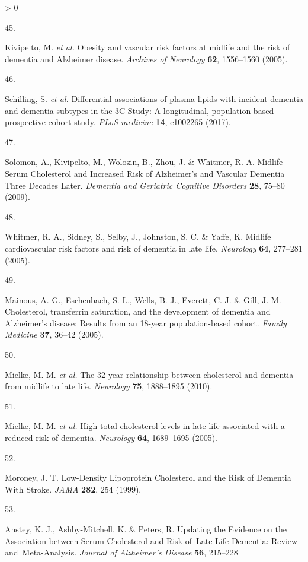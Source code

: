 \documentclass[a4paper, twoside]{templates/ociamthesis}
\newlength{\cslhangindent}
\newlength{\csllabelwidth}
\newenvironment{CSLReferences}[3] %
 {%
  \setlength{\parindent}{0pt}
  \ifodd #1 \everypar{\setlength{\hangindent}{\cslhangindent}}\ignorespaces\fi
  \ifnum #2 > 0
  \setlength{\parskip}{#2\baselineskip}
  \fi
 }%
 {}
\newcommand{\CSLLeftMargin}[1]{\parbox[t]{\maxof{\widthof{#1}}{\csllabelwidth}}{#1}}
\newcommand{\CSLRightInline}[1]{\parbox[t]{\linewidth - \csllabelwidth}{#1}}
\begin{document}
\begin{CSLReferences}{0}{0}
\leavevmode\hypertarget{ref-kivipelto2005}{}%
\CSLLeftMargin{45. }
\CSLRightInline{Kivipelto, M. \emph{et al.} Obesity and vascular risk factors at midlife and the risk of dementia and {Alzheimer} disease. \emph{Archives of Neurology} \textbf{62}, 1556--1560 (2005).}

\leavevmode\hypertarget{ref-schilling2017}{}%
\CSLLeftMargin{46. }
\CSLRightInline{Schilling, S. \emph{et al.} Differential associations of plasma lipids with incident dementia and dementia subtypes in the {3C Study}: {A} longitudinal, population-based prospective cohort study. \emph{PLoS medicine} \textbf{14}, e1002265 (2017).}

\leavevmode\hypertarget{ref-solomon2009}{}%
\CSLLeftMargin{47. }
\CSLRightInline{Solomon, A., Kivipelto, M., Wolozin, B., Zhou, J. \& Whitmer, R. A. Midlife {Serum Cholesterol} and {Increased Risk} of {Alzheimer}'s and {Vascular Dementia Three Decades Later}. \emph{Dementia and Geriatric Cognitive Disorders} \textbf{28}, 75--80 (2009).}

\leavevmode\hypertarget{ref-whitmer2005}{}%
\CSLLeftMargin{48. }
\CSLRightInline{Whitmer, R. A., Sidney, S., Selby, J., Johnston, S. C. \& Yaffe, K. Midlife cardiovascular risk factors and risk of dementia in late life. \emph{Neurology} \textbf{64}, 277--281 (2005).}

\leavevmode\hypertarget{ref-mainous2005}{}%
\CSLLeftMargin{49. }
\CSLRightInline{Mainous, A. G., Eschenbach, S. L., Wells, B. J., Everett, C. J. \& Gill, J. M. Cholesterol, transferrin saturation, and the development of dementia and {Alzheimer}'s disease: Results from an 18-year population-based cohort. \emph{Family Medicine} \textbf{37}, 36--42 (2005).}

\leavevmode\hypertarget{ref-mielke2010}{}%
\CSLLeftMargin{50. }
\CSLRightInline{Mielke, M. M. \emph{et al.} The 32-year relationship between cholesterol and dementia from midlife to late life. \emph{Neurology} \textbf{75}, 1888--1895 (2010).}

\leavevmode\hypertarget{ref-mielke2005}{}%
\CSLLeftMargin{51. }
\CSLRightInline{Mielke, M. M. \emph{et al.} High total cholesterol levels in late life associated with a reduced risk of dementia. \emph{Neurology} \textbf{64}, 1689--1695 (2005).}

\leavevmode\hypertarget{ref-moroney1999}{}%
\CSLLeftMargin{52. }
\CSLRightInline{Moroney, J. T. Low-{Density Lipoprotein Cholesterol} and the {Risk} of {Dementia With Stroke}. \emph{JAMA} \textbf{282}, 254 (1999).}

\leavevmode\hypertarget{ref-anstey}{}%
\CSLLeftMargin{53. }
\CSLRightInline{Anstey, K. J., Ashby-Mitchell, K. \& Peters, R. Updating the {Evidence} on the {Association} between {Serum Cholesterol} and {Risk} of~{Late}-{Life Dementia}: {Review} and~{Meta}-{Analysis}. \emph{Journal of Alzheimer's Disease} \textbf{56}, 215--228}


\end{CSLReferences}
\end{document}
